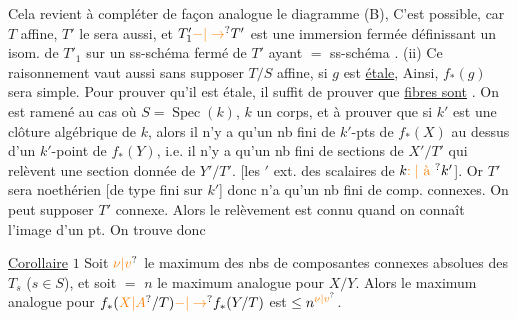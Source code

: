 Cela revient à compléter de façon analogue
le diagramme (B), C'est possible, car
$T$  affine, $T'$ le sera aussi, et
$T'_1\unsure{\mathbin{-}|\to}T'$  est une immersion fermée
définissant un isom. de $T'_1$ sur un
ss-schéma fermé de $T'$ ayant $=$ ss-schéma
.
(ii) Ce raisonnement vaut aussi sans supposer $T/S$
affine, si $g$ est \uline{étale},  Ainsi, $f_\ast(g)$ sera
simple. Pour prouver qu'il est étale, il suffit
de prouver que  \uline{fibres sont}   . On est ramené
au cas où $S=\operatorname{Spec}(k)$, $k$ un corps, et
à prouver que si $k'$ est une
clôture algébrique de $k$, alors il
n'y a qu'un nb fini de $k'$-pts de $f_\ast(X)$ au dessus d'un
$k'$-point de $f_\ast(Y)$, i.e.  il n'y a qu'un nb fini
de sections de $X'/T'$ qui
relèvent une section donnée de $Y'/T'$.
[les $'$  ext. des scalaires de $k\unsure{:|\text{ à }}k'$].
Or $T'$ sera noethérien [de type fini sur $k'$]
donc n'a qu'un nb fini de comp. connexes.
On peut supposer $T'$ connexe. Alors le
relèvement est connu quand on
connaît l'image d'un pt. On trouve
donc

\uline{Corollaire} $1$ Soit $\unsure{\nu|v}$ le maximum des nbs
 de composantes connexes absolues
des $T_s$ ($s\in S$), et soit  $=$ $n$ le
maximum analogue pour $X/Y$. Alors le maximum
analogue pour $f_\ast(\unsure{X|A}/T)\unsure{\mathbin{-}|\to}f_\ast(Y/T)$ est $\leq n^{\unsure{\nu|v}}$.




